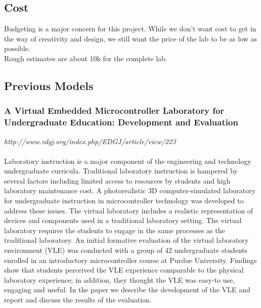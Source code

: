 \documentclass[12pt]{article}
\begin{document}
\subsection{Cost}
\noindent
Budgeting is a major concern for this project. While we don't want cost to get in the way of creativity and design, we still want the price of the lab to be as low as possible. \\

\noindent
Rough estimates are about 10k for the complete lab. 


\subsection{Previous Models}


\subsubsection{A Virtual Embedded Microcontroller Laboratory for Undergraduate Education: Development and Evaluation}
\textit{http://www.edgj.org/index.php/EDGJ/article/view/223} 
\\ \hfill \\
\noindent
Laboratory instruction is a major component of the engineering and technology undergraduate curricula. Traditional laboratory instruction is hampered by several factors including limited access to resources by students and high laboratory maintenance cost. A photorealistic 3D computer-simulated laboratory for undergraduate instruction in microcontroller technology was developed to address these issues. The virtual laboratory includes a realistic representation of devices and components used in a traditional laboratory setting. The virtual laboratory requires the students to engage in the same processes as the traditional laboratory. An initial formative evaluation of the virtual laboratory environment (VLE) was conducted with a group of 42 undergraduate students enrolled in an introductory microcontroller course at Purdue University. Findings show that students perceived the VLE experience comparable to the physical laboratory experience; in addition, they thought the VLE was easy-to use, engaging and useful. In the paper we describe the development of the VLE and report and discuss the results of the evaluation.
\end{document}
